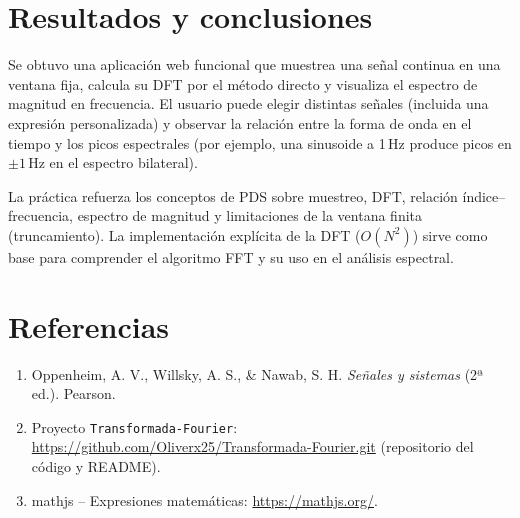 \documentclass[12pt,a4paper]{article}
\begin{document}
\section{Resultados y conclusiones}

Se obtuvo una aplicación web funcional que muestrea una señal continua en una ventana fija, calcula su DFT por el método directo y visualiza el espectro de magnitud en frecuencia. El usuario puede elegir distintas señales (incluida una expresión personalizada) y observar la relación entre la forma de onda en el tiempo y los picos espectrales (por ejemplo, una sinusoide a 1\,Hz produce picos en \(\pm 1\)\,Hz en el espectro bilateral).

La práctica refuerza los conceptos de PDS sobre muestreo, DFT, relación índice--frecuencia, espectro de magnitud y limitaciones de la ventana finita (truncamiento). La implementación explícita de la DFT (\(O(N^2)\)) sirve como base para comprender el algoritmo FFT y su uso en el análisis espectral.

\section*{Referencias}

\begin{enumerate}
  \item Oppenheim, A. V., Willsky, A. S., \& Nawab, S. H. \emph{Señales y sistemas} (2ª ed.). Pearson.
  \item Proyecto \texttt{Transformada-Fourier}: \url{https://github.com/Oliverx25/Transformada-Fourier.git} (repositorio del código y README).
  \item mathjs -- Expresiones matemáticas: \url{https://mathjs.org/}.
\end{enumerate}
\end{document}
